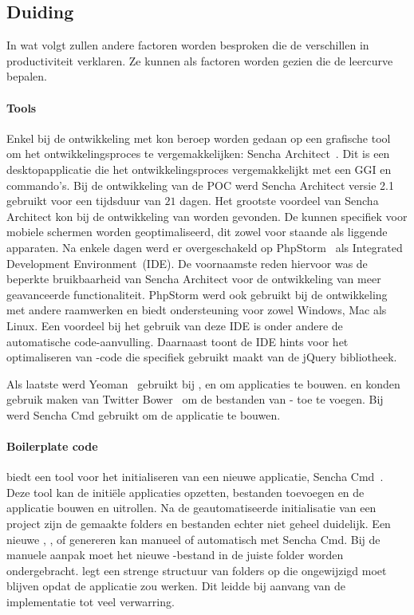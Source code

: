 \subsection{Duiding}
In wat volgt zullen andere factoren worden besproken die de verschillen in productiviteit verklaren.
Ze kunnen als factoren worden gezien die de leercurve bepalen.

\paragraph{Tools}
Enkel bij de ontwikkeling met \st{} kon beroep worden gedaan op een grafische tool om het ontwikkelingsproces te vergemakkelijken:  Sencha Architect~\cite{Sencha2012a}.
Dit is een desktopapplicatie die het ontwikkelingsproces vergemakkelijkt met een GGI en  commando's.  
Bij de ontwikkeling van de POC werd Sencha Architect versie 2.1 gebruikt voor een tijdsduur van $21$ dagen.
Het grootste voordeel van Sencha Architect kon bij de ontwikkeling van  worden gevonden.
De  kunnen specifiek voor mobiele schermen worden geoptimaliseerd, dit zowel voor staande als liggende apparaten.
Na enkele dagen werd er overgeschakeld op PhpStorm~\cite{JetBrains2012} als Integrated Development Environment~(IDE).
De voornaamste reden hiervoor was de beperkte bruikbaarheid van Sencha Architect voor de ontwikkeling van meer geavanceerde functionaliteit.
PhpStorm werd ook gebruikt bij de ontwikkeling met andere raamwerken en biedt ondersteuning voor zowel Windows, Mac als Linux.
Een voordeel bij het gebruik van deze IDE is onder andere de automatische code-aanvulling.
Daarnaast toont de IDE hints voor het optimaliseren van \js{}-code die specifiek gebruikt maakt van de jQuery bibliotheek.

Als laatste werd Yeoman~\cite{Yeoman2013} gebruikt bij \kendo{}, \jqm{} en \lungo{} om applicaties te bouwen.
\kendo{} en \lungo{} konden gebruik maken van Twitter Bower~\cite{Twitter2013} om de bestanden van \gh{}- toe te voegen.
Bij \st{} werd Sencha Cmd gebruikt om de applicatie te bouwen.

\paragraph{Boilerplate code}
\st{} biedt een tool voor het initialiseren van een nieuwe applicatie,  Sencha Cmd~\cite{Sencha2012}.
Deze tool kan de initiële applicaties opzetten,  bestanden toevoegen en de applicatie bouwen en uitrollen.
Na de geautomatiseerde initialisatie van een project zijn de gemaakte folders en bestanden echter niet geheel duidelijk.
Een nieuwe ,  ,   of  genereren kan manueel of automatisch met Sencha Cmd.
Bij de manuele aanpak moet het nieuwe \js-bestand in de juiste folder worden ondergebracht.
\st{} legt een strenge structuur van folders op die ongewijzigd moet blijven opdat de applicatie zou werken.
Dit leidde bij aanvang van de implementatie tot veel verwarring.

